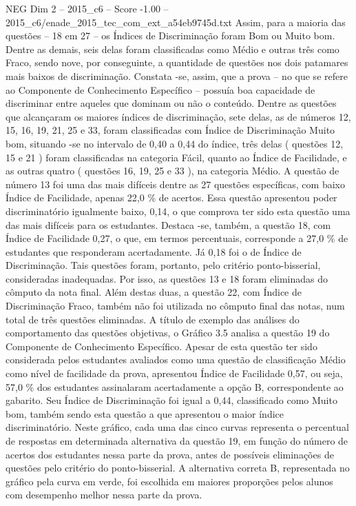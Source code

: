 \begin{textsample}{NEG Dim 2 – 2015\_c6 – Score -1.00 – 2015\_c6/enade\_2015\_tec\_com\_ext\_a54eb9745d.txt}
Assim, para a maioria das questões – 18 em 27 – os Índices de Discriminação foram Bom ou Muito bom.
Dentre as demais, seis delas foram classificadas como Médio e outras três como Fraco, sendo nove, por conseguinte, a quantidade de questões nos dois patamares mais baixos de discriminação.
Constata -se, assim, que a prova – no que se refere ao Componente de Conhecimento Específico – possuía boa capacidade de discriminar entre aqueles que dominam ou não o conteúdo.
Dentre as questões que alcançaram os maiores índices de discriminação, sete delas, as de números 12, 15, 16, 19, 21, 25 e 33, foram classificadas com Índice de Discriminação Muito bom, situando -se no intervalo de 0,40 a 0,44 do índice, três delas ( questões 12, 15 e 21 ) foram classificadas na categoria Fácil, quanto ao Índice de Facilidade, e as outras quatro ( questões 16, 19, 25 e 33 ), na categoria Médio.
A questão de número 13 foi uma das mais difíceis dentre as 27 questões específicas, com baixo Índice de Facilidade, apenas 22,0 \% de acertos.
Essa questão apresentou poder discriminatório igualmente baixo, 0,14, o que comprova ter sido esta questão uma das mais difíceis para os estudantes.
Destaca -se, também, a questão 18, com Índice de Facilidade 0,27, o que, em termos percentuais, corresponde a 27,0 \% de estudantes que responderam acertadamente.
Já 0,18 foi o de Índice de Discriminação.
Tais questões foram, portanto, pelo critério ponto-bisserial, consideradas inadequadas.
Por isso, as questões 13 e 18 foram eliminadas do cômputo da nota final.
Além destas duas, a questão 22, com Índice de Discriminação Fraco, também não foi utilizada no cômputo final das notas, num total de três questões eliminadas.
A título de exemplo das análises do comportamento das questões objetivas, o Gráfico 3.5 analisa a questão 19 do Componente de Conhecimento Específico.
Apesar de esta questão ter sido considerada pelos estudantes avaliados como uma questão de classificação Médio como nível de facilidade da prova, apresentou Índice de Facilidade 0,57, ou seja, 57,0 \% dos estudantes assinalaram acertadamente a opção B, correspondente ao gabarito.
Seu Índice de Discriminação foi igual a 0,44, classificado como Muito bom, também sendo esta questão a que apresentou o maior índice discriminatório.
Neste gráfico, cada uma das cinco curvas representa o percentual de respostas em determinada alternativa da questão 19, em função do número de acertos dos estudantes nessa parte da prova, antes de possíveis eliminações de questões pelo critério do ponto-bisserial.
A alternativa correta B, representada no gráfico pela curva em verde, foi escolhida em maiores proporções pelos alunos com desempenho melhor nessa parte da prova.

\end{textsample}
